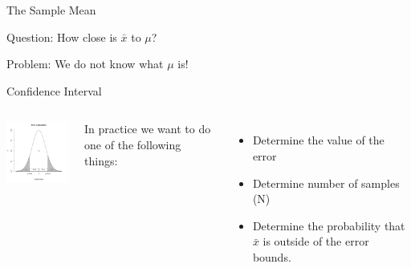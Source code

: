 \begin{frame}{The Sample Mean}


Question: How close is $\bar{x}$ to $\mu$? 

Problem: We do not know what $\mu$ is!
  
\end{frame}


\begin{frame}{Confidence Interval}

  \begin{columns}

    \centerline{\includegraphics[width=4cm]{img/confidenceInterval}}


    In practice we want to do one of the following things:
    \begin{itemize}
    \item Determine the value of the error
    \item Determine number of samples (N)
    \item Determine the probability that $\bar{x}$ is outside of the error bounds.
    \end{itemize}

  \end{columns}
  
\end{frame}


